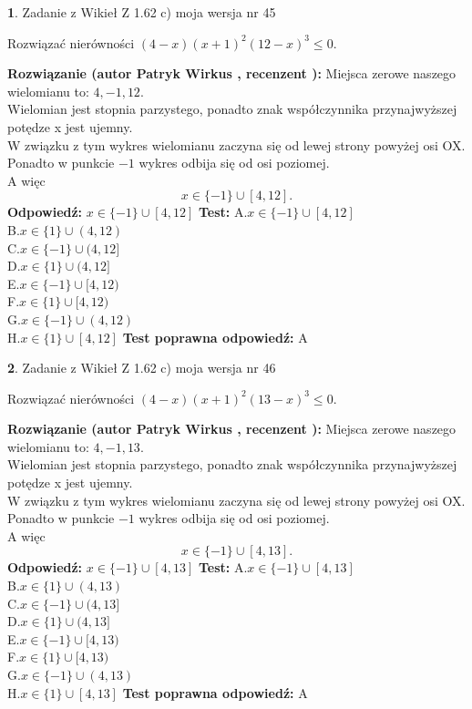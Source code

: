 \documentclass[12pt, a4paper]{article}
\theoremstyle{definition} %
\newtheorem{zad}{}
\newcommand{\zadStart}[1]{\begin{zad}#1\newline}
\newcommand{\zadStop}{\end{zad}}
\newcommand{\rozwStart}[2]{\noindent \textbf{Rozwiązanie (autor #1 , recenzent #2): }\newline}
\newcommand{\rozwStop}{\newline}
\newcommand{\odpStart}{\noindent \textbf{Odpowiedź:}\newline}
\newcommand{\odpStop}{\newline}
\newcommand{\testStart}{\noindent \textbf{Test:}\newline}
\newcommand{\testStop}{\newline}
\newcommand{\kluczStart}{\noindent \textbf{Test poprawna odpowiedź:}\newline}
\newcommand{\kluczStop}{\newline}
\begin{document}
\zadStart{Zadanie z Wikieł Z 1.62 c) moja wersja nr 45}

Rozwiązać nierówności $(4-x)(x+1)^{2}(12-x)^{3}\le0$.
\zadStop
\rozwStart{Patryk Wirkus}{}
Miejsca zerowe naszego wielomianu to: $4, -1, 12$.\\
Wielomian jest stopnia parzystego, ponadto znak współczynnika przy\linebreak najwyższej potędze x jest ujemny.\\ W związku z tym wykres wielomianu zaczyna się od lewej strony powyżej osi OX.\\
Ponadto w punkcie $-1$ wykres odbija się od osi poziomej.\\
A więc $$x \in \{-1\} \cup [4,12].$$
\rozwStop
\odpStart
$x \in \{-1\} \cup [4,12]$
\odpStop
\testStart
A.$x \in \{-1\} \cup [4,12]$\\
B.$x \in \{1\} \cup (4,12)$\\
C.$x \in \{-1\} \cup (4,12]$\\
D.$x \in \{1\} \cup (4,12]$\\
E.$x \in \{-1\} \cup [4,12)$\\
F.$x \in \{1\} \cup [4,12)$\\
G.$x \in \{-1\} \cup (4,12)$\\
H.$x \in \{1\} \cup [4,12]$
\testStop
\kluczStart
A
\kluczStop



\zadStart{Zadanie z Wikieł Z 1.62 c) moja wersja nr 46}

Rozwiązać nierówności $(4-x)(x+1)^{2}(13-x)^{3}\le0$.
\zadStop
\rozwStart{Patryk Wirkus}{}
Miejsca zerowe naszego wielomianu to: $4, -1, 13$.\\
Wielomian jest stopnia parzystego, ponadto znak współczynnika przy\linebreak najwyższej potędze x jest ujemny.\\ W związku z tym wykres wielomianu zaczyna się od lewej strony powyżej osi OX.\\
Ponadto w punkcie $-1$ wykres odbija się od osi poziomej.\\
A więc $$x \in \{-1\} \cup [4,13].$$
\rozwStop
\odpStart
$x \in \{-1\} \cup [4,13]$
\odpStop
\testStart
A.$x \in \{-1\} \cup [4,13]$\\
B.$x \in \{1\} \cup (4,13)$\\
C.$x \in \{-1\} \cup (4,13]$\\
D.$x \in \{1\} \cup (4,13]$\\
E.$x \in \{-1\} \cup [4,13)$\\
F.$x \in \{1\} \cup [4,13)$\\
G.$x \in \{-1\} \cup (4,13)$\\
H.$x \in \{1\} \cup [4,13]$
\testStop
\kluczStart
A
\kluczStop
\end{document}
